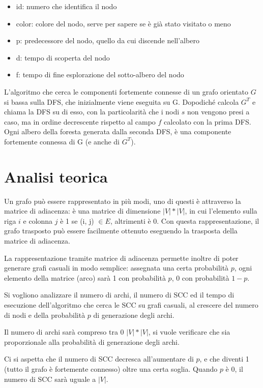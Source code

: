 \documentclass[]{article}
\begin{document}
\begin{itemize}
\item id: numero che identifica il nodo
\item color: colore del nodo, serve per sapere se è già stato visitato o meno
\item p: predecessore del nodo, quello da cui discende nell'albero
\item d: tempo di scoperta del nodo
\item f: tempo di fine esplorazione del sotto-albero del nodo
\end{itemize}

L'algoritmo che cerca le componenti fortemente connesse di un grafo orientato $G$ si bassa sulla DFS, che inizialmente viene eseguita su G. Dopodiché calcola $G^T$ e chiama la DFS su di esso, con la particolarità che i nodi $s$ non vengono presi a caso, ma in ordine decrescente rispetto al campo $f$ calcolato con la prima DFS. Ogni albero della foresta generata dalla seconda DFS, è una componente fortemente connessa di G (e anche di $G^T$).

\section{Analisi teorica}
Un grafo può essere rappresentato in più modi, uno di questi è attraverso la matrice di adiacenza: è una matrice di dimensione $|V|*|V|$, in cui l'elemento sulla riga $i$ e colonna $j$ è 1 se (i, j) $\in E$, altrimenti è 0. Con questa rappresentazione, il grafo trasposto può essere facilmente ottenuto eseguendo la trasposta della matrice di adiacenza.

La rappresentazione tramite matrice di adiacenza permette inoltre di poter generare grafi casuali in modo semplice: assegnata una certa probabilità $p$, ogni elemento della matrice (arco) sarà 1 con probabilità $p$, 0 con probabilità $1-p$.

Si vogliono analizzare il numero di archi, il numero di SCC ed il tempo di esecuzione dell'algoritmo che cerca le SCC su grafi casuali, al crescere del numero di nodi e della probabilità $p$ di generazione degli archi.

Il numero di archi sarà compreso tra 0 $|V|*|V|$, si vuole verificare che sia proporzionale alla probabilità di generazione degli archi.

Ci si aspetta che il numero di SCC decresca all'aumentare di $p$, e che diventi 1 (tutto il grafo è fortemente connesso) oltre una certa soglia. Quando $p$ è 0, il numero di SCC sarà uguale a $|V|$.
\end{document}
